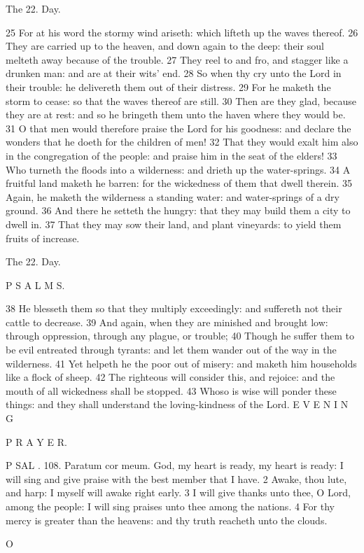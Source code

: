 The 22. Day.

25 For at his word the stormy wind ariseth: which lifteth up the waves thereof. 26 They are carried up to the heaven, and down again to the deep: their soul melteth away because of the trouble. 27 They reel to and fro, and stagger like a drunken man: and are at their wits' end. 28 So when thy cry unto the Lord in their trouble: he delivereth them out of their distress. 29 For he maketh the storm to cease: so that the waves thereof are still. 30 Then are they glad, because they are at rest: and so he bringeth them unto the haven where they would be. 31 O that men would therefore praise the Lord for his goodness: and declare the wonders that he doeth for the children of men! 32 That they would exalt him also in the congregation of the people: and praise him in the seat of the elders! 33 Who turneth the floods into a wilderness: and drieth up the water-springs. 34 A fruitful land maketh he barren: for the wickedness of them that dwell therein. 35 Again, he maketh the wilderness a standing water: and water-springs of a dry ground. 36 And there he setteth the hungry: that they may build them a city to dwell in. 37 That they may sow their land, and plant vineyards: to yield them fruits of increase.

The 22. Day.

P S A L M S.

38 He blesseth them so that they multiply exceedingly: and suffereth not their cattle to decrease. 39 And again, when they are minished and brought low: through oppression, through any plague, or trouble; 40 Though he suffer them to be evil entreated through tyrants: and let them wander out of the way in the wilderness. 41 Yet helpeth he the poor out of misery: and maketh him households like a flock of sheep. 42 The righteous will consider this, and rejoice: and the mouth of all wickedness shall be stopped. 43 Whoso is wise will ponder these things: and they shall understand the loving-kindness of the Lord. E V E N I N G

P R A Y E R.

P SAL . 108. Paratum cor meum. God, my heart is ready, my heart is ready: I will sing and give praise with the best member that I have. 2 Awake, thou lute, and harp: I myself will awake right early. 3 I will give thanks unto thee, O Lord, among the people: I will sing praises unto thee among the nations. 4 For thy mercy is greater than the heavens: and thy truth reacheth unto the clouds.

O

